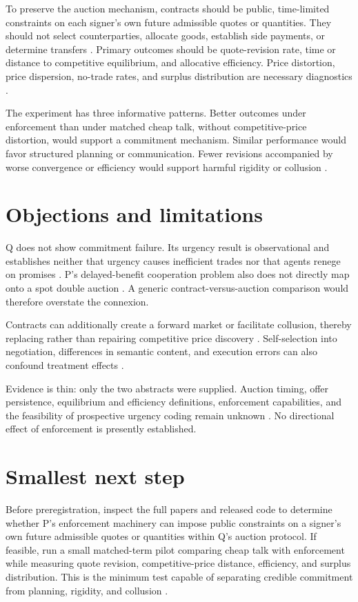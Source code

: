 \documentclass{article}
\begin{document}
To preserve the auction mechanism, contracts should be public, time-limited constraints on each signer's own future admissible quotes or quantities. They should not select counterparties, allocate goods, establish side payments, or determine transfers . Primary outcomes should be quote-revision rate, time or distance to competitive equilibrium, and allocative efficiency. Price distortion, price dispersion, no-trade rates, and surplus distribution are necessary diagnostics .

The experiment has three informative patterns. Better outcomes under enforcement than under matched cheap talk, without competitive-price distortion, would support a commitment mechanism. Similar performance would favor structured planning or communication. Fewer revisions accompanied by worse convergence or efficiency would support harmful rigidity or collusion .

\section{Objections and limitations}

Q does not show commitment failure. Its urgency result is observational and establishes neither that urgency causes inefficient trades nor that agents renege on promises . P's delayed-benefit cooperation problem also does not directly map onto a spot double auction . A generic contract-versus-auction comparison would therefore overstate the connexion.

Contracts can additionally create a forward market or facilitate collusion, thereby replacing rather than repairing competitive price discovery . Self-selection into negotiation, differences in semantic content, and execution errors can also confound treatment effects .

Evidence is thin: only the two abstracts were supplied. Auction timing, offer persistence, equilibrium and efficiency definitions, enforcement capabilities, and the feasibility of prospective urgency coding remain unknown . No directional effect of enforcement is presently established.

\section{Smallest next step}

Before preregistration, inspect the full papers and released code to determine whether P's enforcement machinery can impose public constraints on a signer's own future admissible quotes or quantities within Q's auction protocol. If feasible, run a small matched-term pilot comparing cheap talk with enforcement while measuring quote revision, competitive-price distance, efficiency, and surplus distribution. This is the minimum test capable of separating credible commitment from planning, rigidity, and collusion .
\end{document}
